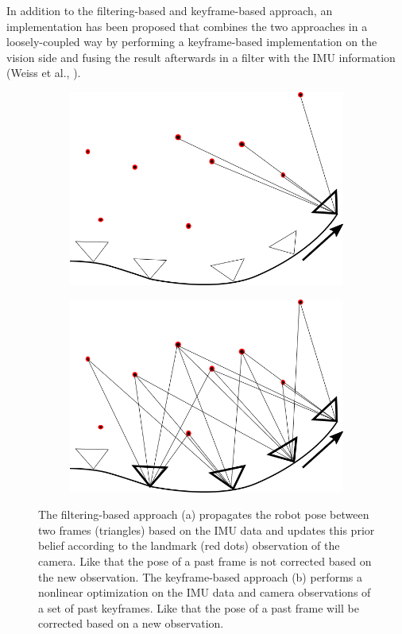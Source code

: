 In addition to the filtering-based and keyframe-based approach, an implementation has been proposed that combines the two approaches in a loosely-coupled way by performing a keyframe-based implementation on the vision side and fusing the result afterwards in a filter with the IMU information (Weiss et al., \cite{weiss2012real}). \\

\begin{figure}
  \begin{subfigure}[b]{0.4\textwidth}
    \includegraphics[width=\textwidth]{images/filteringbased_2.png}
    \caption{}
    \label{fig:1}
  \end{subfigure}
  \hfill
  \begin{subfigure}[b]{0.4\textwidth}
    \includegraphics[width=\textwidth]{images/keyframebased_2.png}
    \caption{}
    \label{fig:2}
  \end{subfigure}
\caption{The filtering-based approach (a) propagates the robot pose between two frames (triangles) based on the IMU data and updates this prior belief according to the landmark (red dots) observation of the camera. Like that the pose of a past frame is not corrected based on the new observation. The keyframe-based approach (b) performs a nonlinear optimization on the IMU data and camera observations of a set of past keyframes. Like that the pose of a past frame will be corrected based on a new observation.}
\label{pics:filtering_keyframe}
\end{figure}

